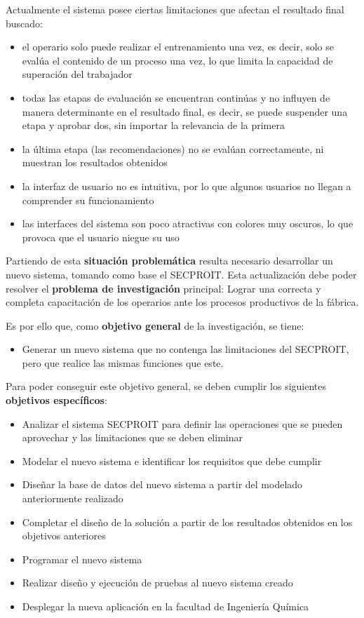 \documentclass[12pt,a4paper]{report}
\begin{document}
Actualmente el sistema posee ciertas limitaciones que afectan el resultado final buscado:
\begin{itemize}
\item el operario solo puede realizar el entrenamiento una vez, es decir, solo se evalúa el contenido de un proceso una vez, lo que limita la capacidad de superación del trabajador
\item todas las etapas de evaluación se encuentran continúas y no influyen de manera determinante en el resultado final, es decir, se puede suspender una etapa y aprobar dos, sin importar la relevancia de la primera
\item la última etapa (las recomendaciones) no se evalúan correctamente, ni muestran los resultados obtenidos
\item la interfaz de usuario no es intuitiva, por lo que algunos usuarios no llegan a comprender su funcionamiento
\item las interfaces del sistema son poco atractivas con colores muy oscuros, lo que provoca que el usuario niegue su uso
\end{itemize}

Partiendo de esta \textbf{situación problemática} resulta necesario desarrollar un nuevo sistema, tomando como base el SECPROIT. Esta actualización debe poder resolver el \textbf{problema de investigación} principal: \textsf{Lograr una correcta y completa capacitación de los operarios ante los procesos productivos de la fábrica.}

Es por ello que, como \textbf{objetivo general} de la investigación, se tiene:
\begin{itemize}
\item Generar un nuevo sistema que no contenga las limitaciones del SECPROIT, pero que realice las mismas funciones que este.
\end{itemize}

Para poder conseguir este objetivo general, se deben cumplir los siguientes \textbf{objetivos específicos}:
\begin{itemize}
\item Analizar el sistema SECPROIT para definir las operaciones que se pueden aprovechar y las limitaciones que se deben eliminar
\item Modelar el nuevo sistema e identificar los requisitos que debe cumplir
\item Diseñar la base de datos del nuevo sistema a partir del modelado anteriormente realizado
\item Completar el diseño de la solución a partir de los resultados obtenidos en los objetivos anteriores
\item Programar el nuevo sistema
\item Realizar diseño y ejecución de pruebas al nuevo sistema creado
\item Desplegar la nueva aplicación en la facultad de Ingeniería Química
\end{itemize}
\end{document}
